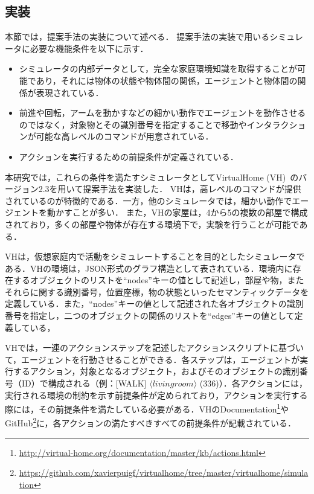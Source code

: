 \subsection{実装} \label{sec4.6}
本節では，提案手法の実装について述べる．
提案手法の実装で用いるシミュレータに必要な機能条件を以下に示す．

\begin{itemize}
    \item シミュレータの内部データとして，完全な家庭環境知識を取得することが可能であり，それには物体の状態や物体間の関係，エージェントと物体間の関係が表現されている．
    \item 前進や回転，アームを動かすなどの細かい動作でエージェントを動作させるのではなく，対象物とその識別番号を指定することで移動やインタラクションが可能な高レベルのコマンドが用意されている．
    \item アクションを実行するための前提条件が定義されている．
\end{itemize}

本研究では，これらの条件を満たすシミュレータとしてVirtualHome (VH)~\cite{Puig_2018_CVPR}のバージョン2.3を用いて提案手法を実装した．
VHは，高レベルのコマンドが提供されているのが特徴的である．一方，他のシミュレータでは，細かい動作でエージェントを動かすことが多い．
また，VHの家屋は，4から5の複数の部屋で構成されており，多くの部屋や物体が存在する環境下で，実験を行うことが可能である．

VHは，仮想家庭内で活動をシミュレートすることを目的としたシミュレータである．VHの環境は，JSON形式のグラフ構造として表されている．環境内に存在するオブジェクトのリストを``nodes''キーの値として記述し，部屋や物，またそれらに関する識別番号，位置座標，物の状態といったセマンティックデータを定義している．また，``nodes''キーの値として記述された各オブジェクトの識別番号を指定し，二つのオブジェクトの関係のリストを``edges''キーの値として定義している，

VHでは，一連のアクションステップを記述したアクションスクリプトに基づいて，エージェントを行動させることができる．各ステップは，エージェントが実行するアクション，対象となるオブジェクト，およびそのオブジェクトの識別番号（ID）で構成される（例：[WALK] $\langle livingroom \rangle$ (336)）．各アクションには，実行される環境の制約を示す前提条件が定められており，アクションを実行する際には，その前提条件を満たしている必要がある．VHのDocumentation\footnote{\url{http://virtual-home.org/documentation/master/kb/actions.html}}やGitHub\footnote{\url{https://github.com/xavierpuigf/virtualhome/tree/master/virtualhome/simulation}}に，各アクションの満たすべきすべての前提条件が記載されている．